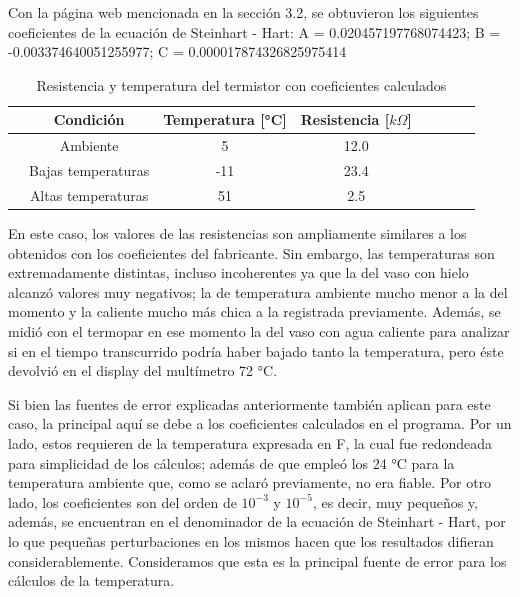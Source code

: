 Con la página web mencionada en la sección 3.2, se obtuvieron los siguientes coeficientes de la ecuación de Steinhart - Hart: A = 0.020457197768074423; B = -0.003374640051255977; C = 0.000017874326825975414

\begin{table}[H]
    \centering
    \footnotesize
    \caption{Resistencia y temperatura del termistor con coeficientes calculados}
    \begin{tabular}{lccccccc}
    \toprule
    & Condición & Temperatura [°C] & Resistencia [$ k\Omega$] \\
    \midrule
        & Ambiente & 5 & 12.0  \\
        & Bajas temperaturas & -11 & 23.4 \\
        & Altas temperaturas & 51 & 2.5 \\
    \bottomrule
    \end{tabular}
    \end{table}
    \vspace{-0.5cm}
    En este caso, los valores de las resistencias son ampliamente similares a los obtenidos con los coeficientes del fabricante. Sin embargo, las temperaturas son 
    extremadamente distintas, incluso incoherentes ya que la del vaso con hielo alcanzó valores muy negativos; la de temperatura ambiente mucho menor a la del momento y la caliente mucho más chica
    a la registrada previamente. Además, se midió con el termopar en ese momento la del vaso con agua caliente para analizar si en el tiempo transcurrido podría haber bajado tanto la temperatura, pero éste
    devolvió en el display del multímetro 72 °C.
    
    Si bien las fuentes de error explicadas anteriormente también aplican para este caso, la principal aquí se debe a los coeficientes calculados en el programa. Por un lado, estos requieren de la temperatura expresada en F, 
    la cual fue redondeada para simplicidad de los cálculos; además de que empleó los 24 °C para la temperatura ambiente que, como se aclaró previamente, no era fiable. Por otro lado, los coeficientes son del orden de $10^{-3}$ y $10^{-5}$, es decir, muy pequeños y, 
    además, se encuentran en el denominador de la ecuación de Steinhart - Hart, por lo que pequeñas perturbaciones en los mismos hacen que los resultados difieran considerablemente. Consideramos que esta es la principal fuente de error para los cálculos de la temperatura.


